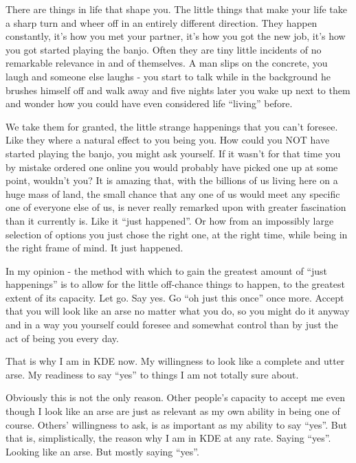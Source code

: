 

\noindent{}There are things in life that shape you. The little things that make your life take a sharp turn and wheer off in an entirely different direction.
They happen constantly, it's how you met your partner, it's how you got the new job, it's how you got started playing the banjo. Often they are tiny little incidents of no remarkable relevance in and of themselves. A man slips on the concrete, you laugh and someone else laughs - you start to talk while in the background he brushes himself off and walk away and five nights later you wake up next to them and wonder how you could have even considered life “living” before.

We take them for granted, the little strange happenings that you can't foresee. Like they where a natural effect to you being you. How could you NOT have started playing the banjo, you might ask yourself. If it wasn't for that time you by mistake ordered one online you would probably have picked one up at some point, wouldn't you?
It is amazing that, with the billions of us living here on a huge mass of land, the small chance that any one of us would meet any specific one of everyone else of us, is never really remarked upon with greater fascination than it currently is. Like it “just happened”.  Or how from an impossibly large selection of options you just chose the right one, at the right time, while being in the right frame of mind. It just happened.

In my opinion - the method with which to gain the greatest amount of “just happenings” is to allow for the little off-chance things to happen, to the greatest extent of its capacity. Let go. Say yes. Go “oh just this once” once more. Accept that you will look like an arse no matter what you do, so you might do it anyway and in a way you yourself could foresee and somewhat control than by just the act of being you every day. 

That is why I am in KDE now. My willingness to look like a complete and utter arse. My readiness to say “yes” to things I am not totally sure about.

Obviously this is not the only reason. Other people's capacity to accept me even though I look like an arse are just as relevant as my own ability in being one of course. Others' willingness to ask, is as important as my ability to say “yes”. But that is, simplistically, the reason why I am in KDE at any rate. Saying “yes”. Looking like an arse. But mostly saying “yes”.

